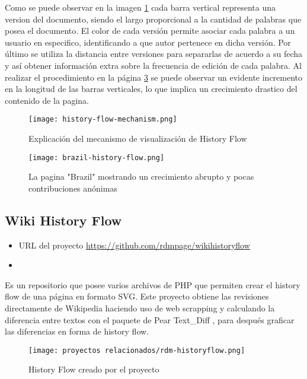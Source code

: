 Como se puede observar en la imagen \ref*{fig:history-flow-mechanism} cada barra vertical representa una version del documento, siendo el largo proporcional a la cantidad de palabras que posea el documento. El color de cada versión permite asociar cada palabra a un usuario en especifico, identificando a que autor pertenece en dicha versión. Por último se utiliza la distancia entre versiones para separarlas de acuerdo a su fecha y así obtener información extra sobre la frecuencia de edición de cada palabra. Al realizar el procedimiento en la página  \ref*{fig:brazil-history-flow} se puede observar un evidente incremento en la longitud de las barras verticales, lo que implica un crecimiento drastico del contenido de la pagina.

\begin{figure}[H]
    \texttt{[image: history-flow-mechanism.png]}
    \caption{Explicación del mecanismo de visualización de History Flow}
    \label{fig:history-flow-mechanism}
\end{figure}

\begin{figure}[H]
    \texttt{[image: brazil-history-flow.png]}
    \caption{La pagina "Brazil" mostrando un crecimiento abrupto y pocas contribuciones anónimas}
    \label{fig:brazil-history-flow}
\end{figure}

\subsection{Wiki History Flow}

\begin{itemize}
    \item URL del proyecto \url{https://github.com/rdmpage/wikihistoryflow}
    \item
\end{itemize}

Es un repositorio que posee varios archivos de PHP que permiten crear el history flow de una página en formato SVG. Este proyecto obtiene las revisiones directamente de Wikipedia haciendo uso de web scrapping y calculando la diferencia entre textos con el paquete de Pear Text_Diff \cite{pear_text_diff}, para después graficar las diferencias en forma de history flow.

\begin{figure}[H]
    \texttt{[image: proyectos relacionados/rdm-historyflow.png]}
    \caption{History Flow creado por el proyecto}
    \label{fig:brazil-history-flow}
\end{figure}


